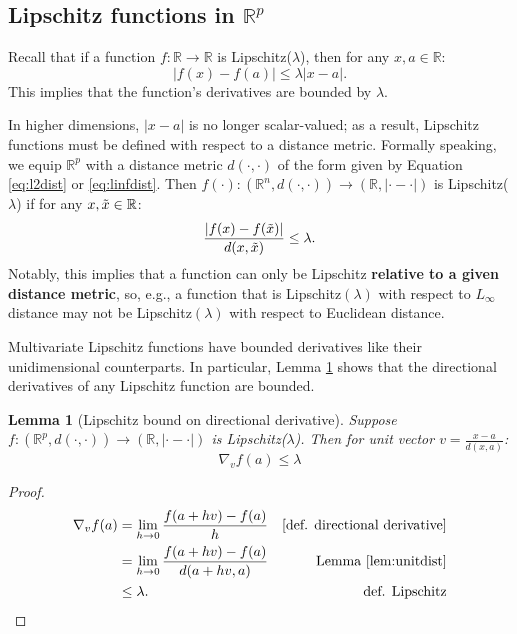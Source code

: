 \documentclass{article}
\newtheorem{lemma}[theorem]{Lemma}
\newcommand{\R}{\mathbb{R}}
\newcommand{\Rp}{\mathbb{R}^p}
\begin{document}
\subsection{Lipschitz functions in $\Rp$}
\label{app:lipschitz}

Recall that if a function $f: \R \to \R$ is Lipschitz($\lambda$), then for any $x, a \in \R$:
\begin{equation*}
    |f(x) - f(a)| \leq \lambda |x-a|.
\end{equation*}
This implies that the function's derivatives are bounded by $\lambda$.

In higher dimensions, $|x-a|$ is no longer scalar-valued;
as a result, Lipschitz functions must be defined with respect to a distance metric.
Formally speaking, we equip $\Rp$ with a distance metric $d(\cdot, \cdot)$ of the form given by Equation \ref{eq:l2dist} or \ref{eq:linfdist}.
Then $f(\cdot): (\R^n, d(\cdot, \cdot)) \to (\R, |\cdot - \cdot|)$ is Lipschitz($\lambda$) if for any $x, \Tilde{x} \in \R$:
\begin{equation*}
    \frac{|f(x) - f(\Tilde{x})|}{d(x, \Tilde{x})} \leq \lambda.
\end{equation*}
Notably, this implies that a function can only be Lipschitz \textbf{relative to a given distance metric},
so, e.g., a function that is Lipschitz$(\lambda)$ with respect to $L_\infty$ distance may not be Lipschitz$(\lambda)$ with respect to Euclidean distance.

Multivariate Lipschitz functions have bounded derivatives like their unidimensional counterparts.
In particular, Lemma \ref{lem:lipbdsdd} shows that the directional derivatives of any Lipschitz function are bounded.
\begin{lemma}[Lipschitz bound on directional derivative]
\label{lem:lipbdsdd}
Suppose $f: (\Rp, d(\cdot, \cdot)) \to (\R, |\cdot - \cdot|)$ is Lipschitz($\lambda$).
Then for unit vector $v = \frac{x-a}{d(x,a)}$:
\begin{equation*}
    \nabla_v f(a) \leq \lambda
\end{equation*}
\end{lemma}
\begin{proof}
\begin{align*}
    \nabla_v f(a) 
    &= \lim_{h \to 0} \frac{f(a + hv) - f(a)}{h} &\text{[def. directional derivative]}\\
    &= \lim_{h \to 0} \frac{f(a + hv) - f(a)}{d(a + hv, a)} &\text{Lemma }\ref{lem:unitdist}\\
    &\leq \lambda. &\text{def. Lipschitz}
\end{align*}
\end{proof}
\end{document}
